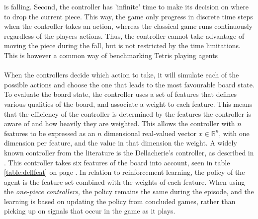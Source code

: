 is falling. Second, the controller has 'infinite'
time to make its decision on where to drop the current piece.
This way, the game only progress in discrete time steps
when the controller takes
an action, whereas the classical game runs continuously 
regardless of the players actions.
Thus, the controller cannot take advantage of moving the piece 
during the fall, but is not restricted by the time limitations.
This is however a common way of benchmarking Tetris playing agents
\citep{scherrer2009}\\
\\
When the controllers decide which action to take, it will
simulate each of the possible actions and choose the one that
leads to the most favourable board state. To evaluate the board 
state, the controller uses a set of features that defines 
various qualities of the board, and associate a weight to each 
feature. This means that the efficiency of the controller 
is determined by the features the controller is aware of
and how heavily they are weighted. This allows
the controller with $n$ features to be expressed as an 
$n$ dimensional real-valued vector $x \in \mathbb{R}^n$, with one dimension 
per feature, and the value in that dimension the weight.
A widely known controller from the literature is the Dellacherie's controller, 
as described in \cite{scherrer2009}. This controller
takes six features of the board into account, seen in table 
\ref{table:dellfeat} on page \pageref{table:dellfeat}. In relation 
to reinforcement learning, the policy of the agent is the feature set
combined with the weights of each feature. 
When using the \textit{one-piece controllers}, the policy remains 
the same during the episode, and the learning is based on updating
the policy from concluded games, rather than picking up on signals
that occur in the game as it plays.





